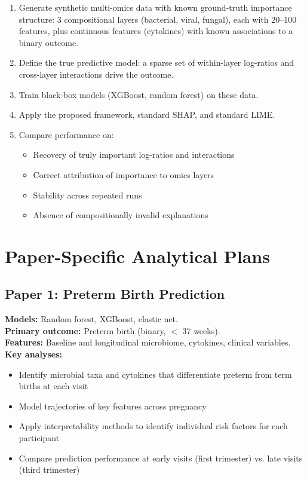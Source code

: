 \documentclass[12pt,a4paper]{report}
\begin{document}
\begin{enumerate}
    \item Generate synthetic multi-omics data with known ground-truth importance structure: 3 compositional layers (bacterial, viral, fungal), each with 20--100 features, plus continuous features (cytokines) with known associations to a binary outcome.
    \item Define the true predictive model: a sparse set of within-layer log-ratios and cross-layer interactions drive the outcome.
    \item Train black-box models (XGBoost, random forest) on these data.
    \item Apply the proposed framework, standard SHAP, and standard LIME.
    \item Compare performance on:
    \begin{itemize}
        \item Recovery of truly important log-ratios and interactions
        \item Correct attribution of importance to omics layers
        \item Stability across repeated runs
        \item Absence of compositionally invalid explanations
    \end{itemize}
\end{enumerate}

\section{Paper-Specific Analytical Plans}

\subsection{Paper 1: Preterm Birth Prediction}

\textbf{Models:} Random forest, XGBoost, elastic net.\\
\textbf{Primary outcome:} Preterm birth (binary, $<$ 37 weeks).\\
\textbf{Features:} Baseline and longitudinal microbiome, cytokines, clinical variables.\\
\textbf{Key analyses:}
\begin{itemize}
    \item Identify microbial taxa and cytokines that differentiate preterm from term births at each visit
    \item Model trajectories of key features across pregnancy
    \item Apply interpretability methods to identify individual risk factors for each participant
    \item Compare prediction performance at early visits (first trimester) vs. late visits (third trimester)
\end{itemize}
\end{document}
